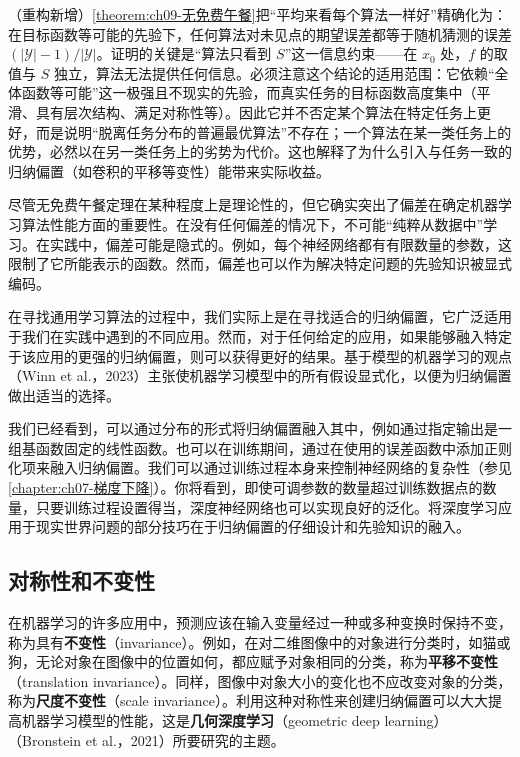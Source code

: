 \documentclass[../../main.tex]{subfiles}
\begin{document}
\begin{remark}（重构新增）\cref{theorem:ch09-无免费午餐}把“平均来看每个算法一样好”精确化为：在目标函数等可能的先验下，任何算法对未见点的期望误差都等于随机猜测的误差 $(|\mathcal{Y}|-1)/|\mathcal{Y}|$。证明的关键是“算法只看到 $S$”这一信息约束——在 $x_{0}$ 处，$f$ 的取值与 $S$ 独立，算法无法提供任何信息。必须注意这个结论的适用范围：它依赖“全体函数等可能”这一极强且不现实的先验，而真实任务的目标函数高度集中（平滑、具有层次结构、满足对称性等）。因此它并不否定某个算法在特定任务上更好，而是说明“脱离任务分布的普遍最优算法”不存在；一个算法在某一类任务上的优势，必然以在另一类任务上的劣势为代价。这也解释了为什么引入与任务一致的归纳偏置（如卷积的平移等变性）能带来实际收益。
\end{remark}

尽管无免费午餐定理在某种程度上是理论性的，但它确实突出了偏差在确定机器学习算法性能方面的重要性。在没有任何偏差的情况下，不可能“纯粹从数据中”学习。在实践中，偏差可能是隐式的。例如，每个神经网络都有有限数量的参数，这限制了它所能表示的函数。然而，偏差也可以作为解决特定问题的先验知识被显式编码。

在寻找通用学习算法的过程中，我们实际上是在寻找适合的归纳偏置，它广泛适用于我们在实践中遇到的不同应用。然而，对于任何给定的应用，如果能够融入特定于该应用的更强的归纳偏置，则可以获得更好的结果。基于模型的机器学习的观点（Winn et al.，2023）主张使机器学习模型中的所有假设显式化，以便为归纳偏置做出适当的选择。

我们已经看到，可以通过分布的形式将归纳偏置融入其中，例如通过指定输出是一组基函数固定的线性函数。也可以在训练期间，通过在使用的误差函数中添加正则化项来融入归纳偏置。我们可以通过训练过程本身来控制神经网络的复杂性（参见\cref{chapter:ch07-梯度下降}）。你将看到，即使可调参数的数量超过训练数据点的数量，只要训练过程设置得当，深度神经网络也可以实现良好的泛化。将深度学习应用于现实世界问题的部分技巧在于归纳偏置的仔细设计和先验知识的融入。

\subsection{对称性和不变性}\label{subsection:ch09-对称性不变性}

在机器学习的许多应用中，预测应该在输入变量经过一种或多种变换时保持不变，称为具有\textbf{不变性}（invariance）。例如，在对二维图像中的对象进行分类时，如猫或狗，无论对象在图像中的位置如何，都应赋予对象相同的分类，称为\textbf{平移不变性}（translation invariance）。同样，图像中对象大小的变化也不应改变对象的分类，称为\textbf{尺度不变性}（scale invariance）。利用这种对称性来创建归纳偏置可以大大提高机器学习模型的性能，这是\textbf{几何深度学习}（geometric deep learning）（Bronstein et al.，2021）所要研究的主题。
\end{document}
